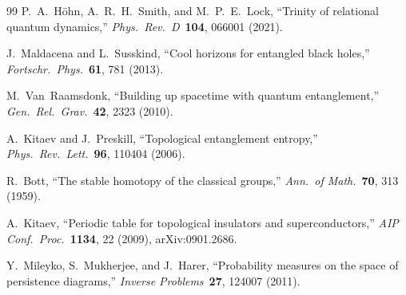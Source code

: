 \documentclass[11pt, a4paper]{article}
\begin{document}
\begin{thebibliography}{99}
P.~A.~H\"{o}hn, A.~R.~H.~Smith, and M.~P.~E.~Lock, ``Trinity of relational quantum dynamics,'' \textit{Phys.\ Rev.\ D}\ \textbf{104}, 066001 (2021).

J.~Maldacena and L.~Susskind, ``Cool horizons for entangled black holes,'' \textit{Fortschr.\ Phys.}\ \textbf{61}, 781 (2013).

M.~Van~Raamsdonk, ``Building up spacetime with quantum entanglement,'' \textit{Gen.\ Rel.\ Grav.}\ \textbf{42}, 2323 (2010).

A.~Kitaev and J.~Preskill, ``Topological entanglement entropy,'' \textit{Phys.\ Rev.\ Lett.}\ \textbf{96}, 110404 (2006).

R.~Bott, ``The stable homotopy of the classical groups,'' \textit{Ann.\ of Math.}\ \textbf{70}, 313 (1959).

A.~Kitaev, ``Periodic table for topological insulators and superconductors,'' \textit{AIP Conf.\ Proc.}\ \textbf{1134}, 22 (2009), arXiv:0901.2686.

Y.~Mileyko, S.~Mukherjee, and J.~Harer, ``Probability measures on the space of persistence diagrams,'' \textit{Inverse Problems}\ \textbf{27}, 124007 (2011).

\end{thebibliography}
\end{document}
